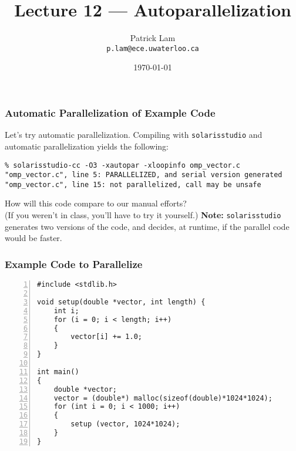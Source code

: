 

\title{Lecture 12 --- Autoparallelization }

\author{Patrick Lam \\ \small \texttt{p.lam@ece.uwaterloo.ca}}
\date{\today}




\begin{frame}
  \titlepage

 \end{frame}

\begin{frame}[fragile]
  \frametitle{Automatic Parallelization of Example Code}


  Let's try automatic parallelization.
  \vfill
  Compiling with {\tt solarisstudio} and automatic parallelization yields
  the following:


{\scriptsize
  \begin{lstlisting}
% solarisstudio-cc -O3 -xautopar -xloopinfo omp_vector.c 
"omp_vector.c", line 5: PARALLELIZED, and serial version generated                 
"omp_vector.c", line 15: not parallelized, call may be unsafe
  \end{lstlisting}
}

  How will this code compare to our manual efforts? \\
  (If you weren't in class, you'll have to try it yourself.)
  \vfill
  {\bf Note:} {\tt solarisstudio} generates two versions of the code, 
  and decides, at runtime, if the parallel code would be faster.


\end{frame}

\begin{frame}[fragile]
  \frametitle{Example Code to Parallelize}


  \begin{lstlisting}[numbers=left]
#include <stdlib.h>

void setup(double *vector, int length) {
    int i;
    for (i = 0; i < length; i++)
    {
        vector[i] += 1.0;
    }
}

int main()
{
    double *vector;
    vector = (double*) malloc(sizeof(double)*1024*1024);
    for (int i = 0; i < 1000; i++)
    {
        setup (vector, 1024*1024);
    }
}
  \end{lstlisting}

\end{frame}

